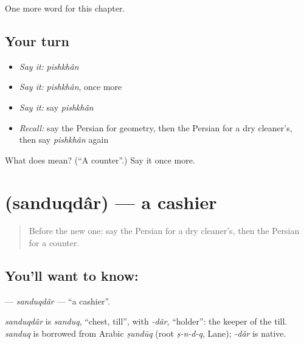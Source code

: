 \begin{grammarlens}[title={What you've built}]
One more word for this chapter.
\end{grammarlens}

\subsection*{Your turn}
\begin{itemize}
\raggedright
  \item \emph{Say it:} \emph{pishkhân}
  \item \emph{Say it:} \emph{pishkhân}, once more
  \item \emph{Say it:} say \emph{pishkhân}
  \item \emph{Recall:} say the Persian for geometry, then the Persian for a dry cleaner's, then say \emph{pishkhân} again
\end{itemize}

\begin{tcolorbox}[breakable,colback=teal!4,colframe=teal!35!black,title={Before you move on}]
What does  mean? (\textquotedblleft{}A counter\textquotedblright{}.) Say it once more.
\end{tcolorbox}
\section[\texorpdfstring{\fa{صندوقدار} (sanduqdâr)}{صندوقدار (sanduqdâr)}]{ (sanduqdâr) — a cashier}

\label{lesson:FA-C286-sanduqdar}



\begin{quote}
Before the new one: say the Persian for a dry cleaner's, then the Persian for a counter.
\end{quote}

\subsection*{You'll want to know: }
\textbf{} — \emph{sanduqdâr} — \textquotedblleft{}a cashier\textquotedblright{}.

\begin{cousinweb}
\emph{sanduqdâr} is \emph{sanduq}, \textquotedblleft{}chest, till\textquotedblright{}, with \emph{-dâr}, \textquotedblleft{}holder\textquotedblright{}: the keeper of the till. \emph{sanduq} is borrowed from Arabic \emph{ṣundūq} (root \emph{ṣ-n-d-q}, Lane); \emph{-dâr} is native.
\end{cousinweb}

